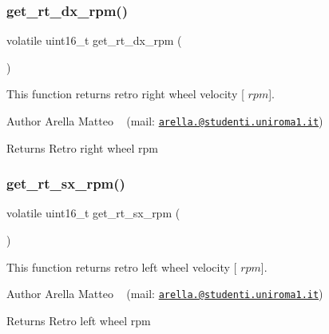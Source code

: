 \mbox{\label{group___board__model__group_ga812f59d2bf258b811a7ff9184ba23e78}} 
\subsubsection{\texorpdfstring{get\+\_\+rt\+\_\+dx\+\_\+rpm()}{get\_rt\_dx\_rpm()}}
{\footnotesize\ttfamily volatile uint16\+\_\+t get\+\_\+rt\+\_\+dx\+\_\+rpm (\begin{DoxyParamCaption}{ }\end{DoxyParamCaption})}



This function returns retro right wheel velocity \mbox{[} $rpm$\mbox{]}. 

\begin{DoxyAuthor}{Author}
Arella Matteo ~\newline
 (mail\+: \href{mailto:arella.1646983@studenti.uniroma1.it}{\tt arella.@studenti.\+uniroma1.\+it})
\end{DoxyAuthor}
\begin{DoxyReturn}{Returns}
Retro right wheel rpm 
\end{DoxyReturn}
\mbox{\label{group___board__model__group_ga81c1dfd585ff1f0b26b38148909e064c}} 
\subsubsection{\texorpdfstring{get\+\_\+rt\+\_\+sx\+\_\+rpm()}{get\_rt\_sx\_rpm()}}
{\footnotesize\ttfamily volatile uint16\+\_\+t get\+\_\+rt\+\_\+sx\+\_\+rpm (\begin{DoxyParamCaption}{ }\end{DoxyParamCaption})}



This function returns retro left wheel velocity \mbox{[} $rpm$\mbox{]}. 

\begin{DoxyAuthor}{Author}
Arella Matteo ~\newline
 (mail\+: \href{mailto:arella.1646983@studenti.uniroma1.it}{\tt arella.@studenti.\+uniroma1.\+it})
\end{DoxyAuthor}
\begin{DoxyReturn}{Returns}
Retro left wheel rpm 
\end{DoxyReturn}
\mbox{\label{group___board__model__group_gace5a444da39d4366693503c53f0841c2}} 
